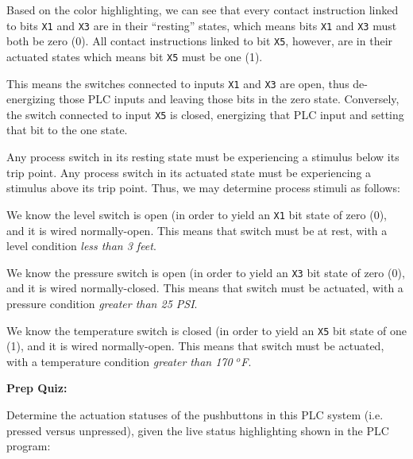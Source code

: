 







Based on the color highlighting, we can see that every contact instruction linked to bits {\tt X1} and {\tt X3} are in their ``resting'' states, which means bits {\tt X1} and {\tt X3} must both be zero (0).  All contact instructions linked to bit {\tt X5}, however, are in their actuated states which means bit {\tt X5} must be one (1).

This means the switches connected to inputs {\tt X1} and {\tt X3} are open, thus de-energizing those PLC inputs and leaving those bits in the zero state.  Conversely, the switch connected to input {\tt X5} is closed, energizing that PLC input and setting that bit to the one state.

Any process switch in its resting state must be experiencing a stimulus below its trip point.  Any process switch in its actuated state must be experiencing a stimulus above its trip point.  Thus, we may determine process stimuli as follows:

\vskip 10pt

\noindent
We know the level switch is open (in order to yield an {\tt X1} bit state of zero (0), and it is wired normally-open.  This means that switch must be at rest, with a level condition {\it less than 3 feet}.

\vskip 10pt

\noindent
We know the pressure switch is open (in order to yield an {\tt X3} bit state of zero (0), and it is wired normally-closed.  This means that switch must be actuated, with a pressure condition {\it greater than 25 PSI}.

\vskip 10pt

\noindent
We know the temperature switch is closed (in order to yield an {\tt X5} bit state of one (1), and it is wired normally-open.  This means that switch must be actuated, with a temperature condition {\it greater than 170 $^{o}$F}.













\vfil \eject

\noindent
{\bf Prep Quiz:}

Determine the actuation statuses of the pushbuttons in this PLC system (i.e. pressed versus unpressed), given the live status highlighting shown in the PLC program:

